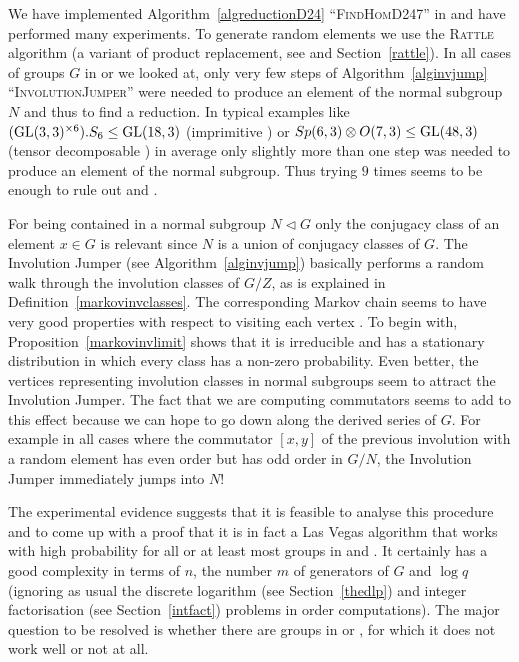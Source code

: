 \begin{Obs}
We have implemented Algorithm~\ref{algreductionD24}
``\textsc{FindHomD247}'' in {\GAP} and have
performed many experiments. To generate random elements we use the
\textsc{Rattle} algorithm (a variant of product replacement, see
%
\cite{LGMurray, LGO97} and Section~\ref{rattle}). 
In all cases of groups $G$ in  or  we
looked at, only very few steps of Algorithm~\ref{alginvjump}
``\textsc{InvolutionJumper}'' were needed to produce an element of the
normal subgroup $N$ and thus to find a reduction. In typical examples
like $(\GL(3,3)^{\times 6}).S_6 \le \GL(18,3)$ (imprimitive ) or $Sp(6,3)
\otimes O(7,3) \le \GL(48,3)$ (tensor decomposable ) 
in average only slightly more than one
step was needed to produce an element of the normal subgroup. Thus trying
$9$ times seems to be enough to rule out  and .
\end{Obs}

\begin{Expl}
For being contained in a normal subgroup $N \triangleleft G$ only the
conjugacy class of an element $x \in G$ is relevant since $N$ is a union of
conjugacy classes of $G$. The Involution Jumper (see Algorithm~\ref{alginvjump}) 
basically performs a random walk through the involution classes of $G/Z$,
as is explained in Definition~\ref{markovinvclasses}. 
The corresponding Markov chain seems to have very good properties with
respect to visiting each vertex . 
To begin with, Proposition~\ref{markovinvlimit} shows that it is irreducible
and has a stationary distribution in which every class has a non-zero 
probability. Even better, the vertices representing
involution classes in normal subgroups seem to attract the Involution
Jumper. The fact that we are computing commutators seems to add to this
effect because we can hope to go down along the derived series of $G$.
For example in all cases where the commutator $[x,y]$ of the previous
involution with a random element has even order but has odd order in
$G/N$, the Involution Jumper immediately jumps into $N$!

The experimental evidence suggests that it is feasible to analyse this
procedure and to come up with a proof that it is in fact a Las Vegas
algorithm that works with high probability for all or at least most groups
in  and . It certainly has a good complexity in terms of $n$, the
number $m$ of generators of $G$ and $\log q$ (ignoring as usual the
discrete logarithm (see Section~\ref{thedlp}) and integer factorisation 
(see Section~\ref{intfact}) problems in order computations). 
The major question to be
resolved is whether there are groups in  or , for which it
does not work well or not at all.
\end{Expl}

